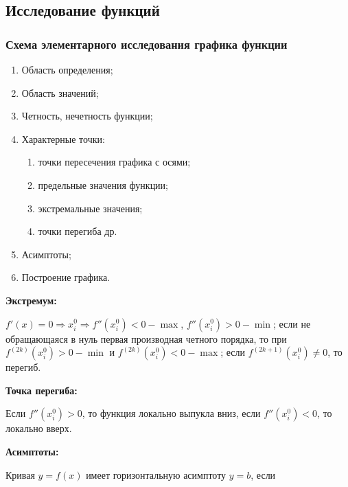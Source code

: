 \subsection{Исследование функций}

\subsubsection{Схема элементарного исследования графика функции}

\begin{enumerate}
	\item Область определения;
	
	\item Область значений;
	
	\item Четность, нечетность функции;
	
	\item Характерные точки:
	
	\begin{enumerate}
		\item точки пересечения графика с осями;
		
		\item предельные значения функции;
		
		\item экстремальные значения;
		
		\item точки перегиба др.
	\end{enumerate}
	
	\item Асимптоты;
	
	\item Построение графика.
\end{enumerate}

\textbf{Экстремум:}

$f' (x) = 0 \Rightarrow x^{0}_{i} \Rightarrow f'' (x^{0}_{i}) < 0 - \max$, $f'' (x^{0}_{i}) > 0 - \min$; если не обращающаяся в нуль первая производная четного порядка, то при $f^{(2 k)} (x^{0}_{i}) > 0 - \min$ и $f^{(2 k)} (x^{0}_{i}) < 0 - \max$; если $f^{(2 k + 1)} (x^{0}_{i}) \neq 0$, то перегиб.

\textbf{Точка перегиба:}

Если $f'' (x^{0}_{i}) > 0$, то функция локально выпукла вниз, если $f'' (x^{0}_{i}) < 0$, то локально вверх.

\textbf{Асимптоты:}

Кривая $y = f(x)$ имеет горизонтальную асимптоту $y = b$, если

